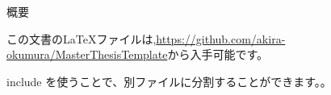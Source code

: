 \documentclass[twoside,openright,a4paper,papersize,uplatex,dvipdfmx]{jsbook}
\begin{document}
\frontmatter

\maketitle

\thispagestyle{empty}

\begin{center}
  {\large \sf 概要}
\end{center}



この文書の\LaTeX {}ファイルは,\url{https://github.com/akira-okumura/MasterThesisTemplate}から入手可能です。

\tableofcontents
\listoffigures
\listoftables

\mainmatter

include を使うことで、別ファイルに分割することができます。。

% 
% 
% 
% 
% 
% 
% 
% 
% 
% 
% 
% 

\renewcommand{\bibname}{引用文献}


\label{page:bib}
\end{document}
